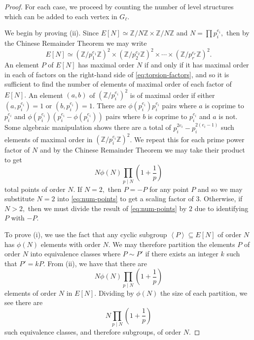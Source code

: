\documentclass[11pt,a4paper]{amsart}
\theoremstyle{plain}
\theoremstyle{definition}
\theoremstyle{remark}
\begin{document}
\begin{proof}
  For each case, we proceed by counting the number of level structures which can be added to each vertex in $G_{\ell}.$

  We begin by proving (ii). Since $E[N] \simeq \mathbb{Z}/N\mathbb{Z} \times \mathbb{Z}/N \mathbb{Z}$ and $N = \prod p_i^{e_i},$ then by the Chinese Remainder Theorem we may write
  \begin{equation}\label{eq:torsion-factors}
    E[N] \simeq \left( \mathbb{Z}/p_1^{e_1}\mathbb{Z} \right)^2 \times \left( \mathbb{Z}/p_2^{e_2}\mathbb{Z} \right)^2 \times \cdots \times \left( \mathbb{Z}/p_r^{e_r}\mathbb{Z} \right)^2.
  \end{equation}
   An element $P$ of $E[N]$ has maximal order $N$ if and only if it has maximal order in each of factors on the right-hand side of \eqref{eq:torsion-factors}, and so it is sufficient to find the number of elements of maximal order of each factor of $E[N].$ An element $(a,b)$ of $(\mathbb{Z}/p_i^{e_i})^2$ is of maximal order if either $(a,p_i^{e_i}) = 1$ or $(b, p_i^{e_i}) = 1.$ There are $\phi(p_i^{e_i})p_i^{e_i}$ pairs where $a$ is coprime to $p_i^{e_i}$ and $\phi(p_i^{e_i})(p_i^{e_i} - \phi(p_i^{e_i}))$ pairs where $b$ is coprime to $p_i^{e_i}$ and $a$ is not. Some algebraic manipulation shows there are a total of $p_i^{2e_i} - p_i^{2(e_i-1)}$ such elements of maximal order in $(\mathbb{Z}/p_i^{e_i}\mathbb{Z})^2$. We repeat this for each prime power factor of $N$ and by the Chinese Remainder Theorem we may take their product to get
  \begin{equation}\label{eq:num-points}
    N \phi(N) \prod_{p \mid N}\left(1 + \frac{1}{p}\right)
  \end{equation}
  total points of order $N.$ If $N = 2,$ then $P = -P$ for any point $P$ and so we may substitute $N = 2$ into \eqref{eq:num-points} to get a scaling factor of $3.$ Otherwise, if $N > 2,$ then we must divide the result of \eqref{eq:num-points} by $2$ due to identifying $P$ with $-P.$

  To prove (i), we use the fact that any cyclic subgroup $\left\langle P \right\rangle \subseteq E[N]$ of order $N$ has $\phi(N)$ elements with order $N.$ We may therefore partition the elements $P$ of order $N$ into equivalence classes where $P \sim P'$ if there exists an integer $k$ such that $P' = kP.$ From (ii), we have that there are
  \[
    N\phi(N)\prod_{p \mid N}\left( 1 + \frac{1}{p} \right)
  \]
  elements of order $N$ in $E[N].$ Dividing by $\phi(N)$ the size of each partition, we see there are
  \[
     N \prod_{p \mid N}\left( 1 + \frac{1}{p} \right)
  \]
  such equivalence classes, and therefore subgroups, of order $N.$


\end{proof}
\end{document}
